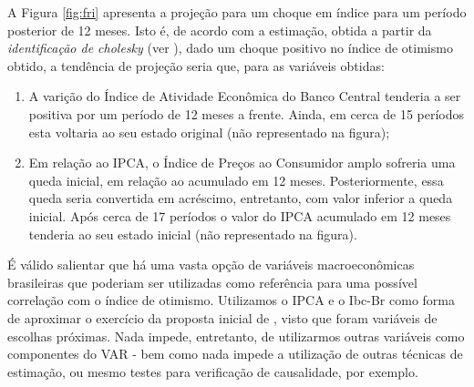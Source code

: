 A Figura \ref{fig:fri} apresenta a projeção para um choque em índice para um período posterior de 12 meses. Isto é, de acordo com a estimação, obtida a partir da \textit{identificação de cholesky} (ver ), dado um choque positivo no índice de otimismo obtido, a tendência de projeção seria que, para as variáveis obtidas:

\begin{enumerate}
    \item A varição do Índice de Atividade Econômica do Banco Central tenderia a ser positiva por um período de 12 meses a frente. Ainda, em cerca de 15 períodos esta voltaria ao seu estado original (não representado na figura);
    \item Em relação ao IPCA, o Índice de Preços ao Consumidor amplo sofreria uma queda inicial, em relação ao acumulado em 12 meses. Posteriormente, essa queda seria convertida em acréscimo, entretanto, com valor inferior a queda inicial. Após cerca de 17 períodos o valor do IPCA acumulado em 12 meses tenderia ao seu estado inicial (não representado na figura). 
\end{enumerate}

É válido salientar que há uma vasta opção de variáveis macroeconômicas brasileiras que poderiam ser utilizadas como referência para uma possível correlação com o índice de otimismo. Utilizamos o IPCA e o Ibc-Br como forma de aproximar o exercício da proposta inicial de , visto que foram variáveis de escolhas próximas. Nada impede, entretanto, de utilizarmos outras variáveis como componentes do VAR - bem como nada impede a utilização de outras técnicas de estimação, ou mesmo testes para verificação de causalidade, por exemplo.





